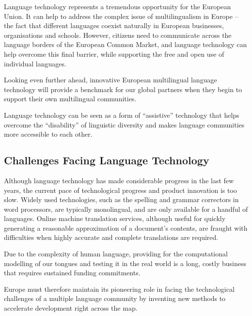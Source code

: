 \begin{multicols}{2}

Language technology represents a tremendous opportunity for the European Union. It can help to address the complex issue of multilingualism in Europe -- the fact that different languages coexist naturally in European businesses, organisations and schools. However, citizens need to communicate across the language borders of the European Common Market, and language technology can help overcome this final barrier, while supporting the free and open use of individual languages. 

Looking even further ahead, innovative European multilingual language technology will provide a benchmark for our global partners when they begin to support their own multilingual communities. 

Language technology can be seen as a form of “assistive” technology that helps overcome the “disability” of linguistic diversity and makes language communities more accessible to each other.


\subsection{Challenges Facing Language Technology}

Although language technology has made considerable progress in the last few years, the current pace of technological progress and product innovation is too slow. Widely used technologies, such as the spelling and grammar correctors in word processors, are typically monolingual, and are only available for a handful of languages. Online machine translation services, although useful for quickly generating a reasonable approximation of a document’s contents, are fraught with difficulties when highly accurate and complete translations are required. 


Due to the complexity of human language, providing for the computational modelling of our tongues and testing it in the real world is a long, costly business that requires sustained funding commitments. 

Europe must therefore maintain its pioneering role in facing the technological challenges of a multiple language community by inventing new methods to accelerate development right across the map.




\end{multicols}
